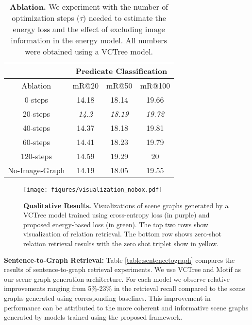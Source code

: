 \documentclass[final]{cvpr}
\begin{document}
\renewcommand{\arraystretch}{1.05}
\begin{table}[t]
\centering
\begin{tabular}{@{}cccc@{}}
\toprule
\toprule
                                    & \multicolumn{3}{c}{Predicate Classification} \\ \midrule
\multicolumn{1}{c|}{Ablation}       & mR@20         & mR@50        & mR@100        \\ \midrule
\multicolumn{1}{c|}{0-steps}        & 14.18         & 18.14        & 19.66         \\
\multicolumn{1}{c|}{20-steps}       & \emph{14.2}          & \emph{18.19}        & \emph{19.72}         \\
\multicolumn{1}{c|}{40-steps}       & 14.37         & 18.18        & 19.81         \\
\multicolumn{1}{c|}{60-steps}       & 14.41         & 18.23        & 19.79         \\
\multicolumn{1}{c|}{120-steps}      & 14.59         & 19.29        & 20            \\ \midrule
\multicolumn{1}{c|}{No-Image-Graph} & 14.19         & 18.05        & 19.55         \\ \bottomrule
\bottomrule
\end{tabular}
\caption{\textbf{Ablation.} We experiment with the number of optimization steps ($\tau$) needed to estimate the energy loss and the effect of excluding image information in the energy model. All numbers were obtained using a VCTree \cite{tang2019learning} model.}
\label{table:ablation}
\vspace{-0.15in}
\end{table}
\begin{figure*}[t]
    \centering
    \texttt{[image: figures/visualization\_nobox.pdf]}
    \vspace{-0.23in}
    \caption{\textbf{Qualitative Results.} Visualizations of scene graphs generated by a VCTree \cite{tang2019learning} model trained using cross-entropy loss (in purple) and proposed energy-based loss (in green). The top two rows show visualization of relation retrieval. The bottom row shows zero-shot relation retrieval results with the zero shot triplet show in yellow.}
    \label{fig:qulaitative_results}
    \vspace{-0.1in}
\end{figure*}

\vspace{0.06in}
\noindent
{\bf Sentence-to-Graph Retrieval:}
Table \ref{table:sentencetograph} compares the results of sentence-to-graph retrieval experiments. We use VCTree and Motif as our scene graph generation architecture. For each model we observe relative improvements ranging from 5\%-23\% in the retrieval recall compared to the scene graphs generated using corresponding baselines. 
This improvement in performance can be attributed to the more coherent and informative scene graphs generated by models trained using the proposed framework.
\end{document}
